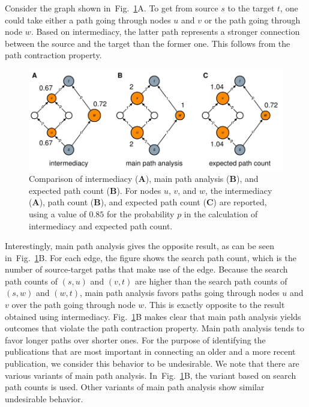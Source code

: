 \documentclass[9pt,twocolumn,twoside,lineno]{pnas-alt}
\theoremstyle{definition}
\newcommand{\subfigref}[2]{Fig.~\ref{fig:#1}#2\xspace}
\begin{document}
Consider the graph shown in~\subfigref{comparison}{A}. To get from source $s$ to the target $t$, one could take either a path going through nodes $u$ and $v$ or the path going through node $w$. Based on intermediacy, the latter path represents a stronger connection between the source and the target than the former one. This follows from the path contraction property.

\begin{sansmath}\begin{figure}[b]
  \centering%
  \includegraphics[width=\linewidth]{comparison}
  \caption{Comparison of intermediacy (\textbf{A}), main path analysis (\textbf{B}), and expected path count (\textbf{B}). For nodes $u$, $v$, and $w$, the intermediacy (\textbf{A}), path count (\textbf{B}), and expected path count (\textbf{C}) are reported, using a value of $0.85$ for the probability $p$ in the calculation of intermediacy and expected path count.}
  \label{fig:comparison}
\end{figure}\end{sansmath}

Interestingly, main path analysis gives the opposite result, as can be seen in~\subfigref{comparison}{B}. For each edge, the figure shows the search path count, which is the number of source-target paths that make use of the edge. Because the search path counts of $(s, u)$ and $(v, t)$ are higher than the search path counts of $(s, w)$ and $(w, t)$, main path analysis favors paths going through nodes $u$ and $v$ over the path going through node $w$. This is exactly opposite to the result obtained using intermediacy. \subfigref{comparison}{B} makes clear that main path analysis yields outcomes that violate the path contraction property. Main path analysis tends to favor longer paths over shorter ones. For the purpose of identifying the publications that are most important in connecting an older and a more recent publication, we consider this behavior to be undesirable. We note that there are various variants of main path analysis. In~\subfigref{comparison}{B}, the variant based on search path counts is used. Other variants of main path analysis show similar undesirable behavior.
\end{document}
